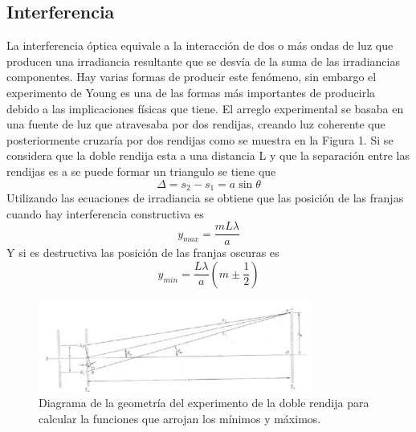 \documentclass[DIV=calc, paper=a4, fontsize=10.5pt]{scrartcl}
\begin{document}
\subsection*{\textcolor{carmine}{Interferencia}}
La interferencia óptica equivale a la interacción de dos o más ondas de luz que producen una irradiancia resultante que se desvía de la suma de las irradiancias componentes. Hay varias formas de producir este fenómeno, sin embargo el experimento de Young es una de las formas más importantes de producirla debido a las implicaciones físicas que tiene\cite{book}. 
El arreglo experimental se basaba en una fuente de luz que atravesaba por dos rendijas, creando luz coherente que posteriormente cruzaría por dos rendijas como se muestra en la Figura 1. 
Si se considera que la doble rendija esta a una distancia L y que la separación entre las rendijas es a se puede formar un triangulo se tiene que 
\begin{equation*}
    \Delta=s_{2}-s_{1}=a\sin{\theta}
\end{equation*}
Utilizando las ecuaciones de irradiancia\cite{Manual} se obtiene que las posición de las franjas cuando hay interferencia constructiva es 
\begin{equation*}
    y_{max}=\frac{mL\lambda}{a}
\end{equation*}
Y si es destructiva las posición de las franjas oscuras es
\begin{equation}
    y_{min}=\frac{L\lambda}{a}\left(m\pm\frac{1}{2}\right)
\end{equation}
\begin{figure}[H]
    \centering
    \includegraphics[width=9cm]{Captura de Pantalla 2022-05-31 a la(s) 16.29.23.png}
    \caption{Diagrama de la geometría del experimento de la doble rendija para calcular la funciones que arrojan los mínimos y máximos.\cite{book}}
    \label{fig:my_label}
\end{figure}
\end{document}
